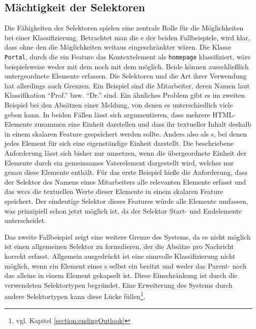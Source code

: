 \subsection{Mächtigkeit der Selektoren}
    \label{section:discussionInterpretationSelectors}
    Die Fähigkeiten der Selektoren spielen eine zentrale Rolle für
    die Möglichkeiten bei einer Klassifizierung.
    Betrachtet man die {\classificationModel}e der beiden Fallbeispiele, wird klar,
    dass ohne den {\xpathSelector} die Möglichkeiten weitaus eingeschränkter wären.
    Die Klasse \texttt{Portal}, durch die ein Feature das Kontextelement
    als {} \texttt{homepage} klassifiziert,
    wäre beispielsweise weder mit dem {\cssSelector}
    noch mit dem {\urlSelector} möglich.
    Beide können ausschließlich untergeordnete Elemente erfassen.
    Die Selektoren und die Art ihrer Verwendung hat allerdings auch Grenzen.
    Ein Beispiel sind die Mitarbeiter, deren Namen laut Klassifikation
    "`Prof."' bzw. "`Dr."' sind.
    Ein ähnliches Problem gibt es im zweiten Beispiel bei den Absätzen einer Meldung,
    von denen es unterschiedlich viele geben kann.
    In beiden Fällen lässt sich argumentieren,
    dass mehrere HTML-Elemente zusammen eine Einheit darstellen
    und dass ihr textueller Inhalt deshalb
    in einem skalaren Feature gespeichert werden sollte.
    Anders also als {\collectionFeature}s,
    bei denen jedes Element für sich eine eigenständige Einheit darstellt.
    Die beschriebene Anforderung lässt sich bisher nur umsetzen,
    wenn die übergeordnete Einheit der Elemente durch ein gemeinsames
    Vaterelement dargestellt wird, welches nur genau diese Elemente enthält.
    Für das erste Beispiel hieße die Anforderung, dass der Selektor des Namens eines Mitarbeiters
    alle relevanten Elemente erfasst und
    das \gls{wccs} die textuellen Werte dieser Elemente
    in einem skalaren Feature speichert.
    Der eindeutige Selektor dieses Features würde alle Elemente umfassen,
    was prinzipiell schon jetzt möglich ist,
    da der Selektor Start- und Endelemente unterscheidet.

    Das zweite Fallbeispiel zeigt eine weitere Grenze des Systems,
    da es nicht möglich ist einen allgemeinen Selektor zu formulieren,
    der die Absätze pro Nachricht korrekt
    erfasst.
    Allgemein ausgedrückt ist eine sinnvolle Klassifizierung nicht möglich,
    wenn ein Element eines {\collectionFeature}s selbst ein {\collectionFeature} besitzt
    und weder das Parent- noch das {\childFeature} alleine in einem Element gekapselt ist.
    Diese Einschränkung ist durch die verwendeten Selektortypen begründet.
    Eine Erweiterung des Systems durch andere Selektortypen kann diese Lücke
    füllen\footnote{vgl. Kapitel \ref{section:endingOutlook}}.

